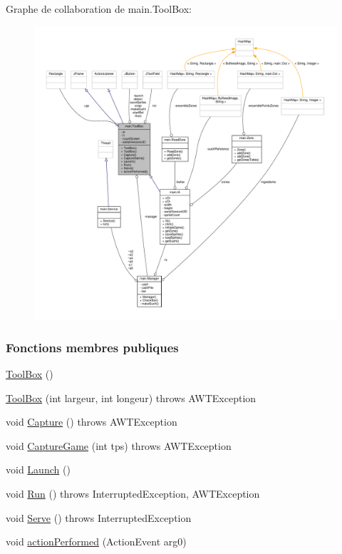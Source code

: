 Graphe de collaboration de main.\+Tool\+Box\+:\nopagebreak
\begin{figure}[H]
\begin{center}
\leavevmode
\includegraphics[width=350pt]{classmain_1_1ToolBox__coll__graph}
\end{center}
\end{figure}
\subsubsection*{Fonctions membres publiques}
\begin{DoxyCompactItemize}
\item 
\hyperlink{classmain_1_1ToolBox_a7ef79130c6e72332560554afde3a9921}{Tool\+Box} ()
\item 
\hyperlink{classmain_1_1ToolBox_a8e76d68f8ca56cd24de23af01ae17a09}{Tool\+Box} (int largeur, int longeur)  throws A\+W\+T\+Exception 
\item 
void \hyperlink{classmain_1_1ToolBox_a33e0e8725b840783eb84374703aebcea}{Capture} ()  throws A\+W\+T\+Exception 
\item 
void \hyperlink{classmain_1_1ToolBox_a01fb48e54f183649df1c9e742b966362}{Capture\+Game} (int tps)  throws A\+W\+T\+Exception 
\item 
void \hyperlink{classmain_1_1ToolBox_a93e4314130826a51bf234791e201bebb}{Launch} ()
\item 
void \hyperlink{classmain_1_1ToolBox_a41a6d959beb73dac4a650719737f5c2c}{Run} ()  throws Interrupted\+Exception, A\+W\+T\+Exception 
\item 
void \hyperlink{classmain_1_1ToolBox_a3ab9626ed8eb24317e4fb8906e215c32}{Serve} ()  throws Interrupted\+Exception 
\item 
void \hyperlink{classmain_1_1ToolBox_a6ff2b68cd96e589959f0b66c45696d07}{action\+Performed} (Action\+Event arg0)
\end{DoxyCompactItemize}
